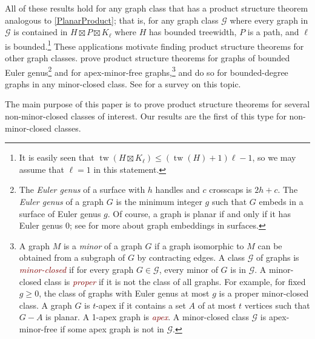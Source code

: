 \documentclass{patmorin}
\theoremstyle{plain}
\theoremstyle{definition}
\newcommand{\defin}[1]{\textcolor{Maroon}{\emph{#1}}}
\newcommand{\note}[2]{\noindent{\color{red}[#1:~#2]}}
\DeclareMathOperator{\tw}{tw}
\renewcommand{\geq}{\geqslant}
\renewcommand{\leq}{\leqslant}
\begin{document}


All of these results hold for any graph class that has a product structure theorem analogous to \cref{PlanarProduct}; that is, for any graph class  $\mathcal{G}$ where every graph in $\mathcal{G}$ is contained in $H\boxtimes P\boxtimes K_\ell$ where $H$ has bounded treewidth, $P$ is a path, and $\ell$ is bounded.\footnote{It is easily seen that $\tw(H\boxtimes K_\ell) \leq (\tw(H)+1)\ell-1$, so we may assume that $\ell=1$ in this statement.} These applications motivate finding product structure theorems for other graph classes. \citet{DJMMUW20} prove product structure theorems for graphs of bounded Euler genus\footnote{The \textit{Euler genus} of a surface with $h$ handles and $c$ crosscaps is $2h+c$. The \textit{Euler genus} of a graph $G$ is the minimum integer $g$ such that $G$ embeds in a surface of Euler genus $g$. Of course, a graph is planar if and only if it has Euler genus 0; see \citep{mohar.thomassen:graphs} for more about graph embeddings in surfaces.} and for apex-minor-free graphs,\footnote{A graph $M$ is a \textit{minor} of a graph $G$ if a graph isomorphic to $M$ can be obtained from a subgraph of $G$ by contracting edges. A class $\mathcal{G}$ of graphs is \defin{minor-closed} if for every graph $G\in\mathcal{G}$, every minor of $G$ is in $\mathcal{G}$. A minor-closed class is \defin{proper} if it is not the class of all graphs. For example, for fixed $g\geq 0$, the class of graphs with Euler genus at most $g$ is a proper minor-closed class. A graph $G$ is $t$-apex if it contains a set $A$ of at most $t$ vertices such that $G-A$ is planar. A 1-apex graph is \defin{apex}.  A minor-closed class $\mathcal{G}$ is apex-minor-free if some apex graph is not in $\mathcal{G}$.} and \citet{DEMWW22} do so for bounded-degree graphs in any minor-closed class. See 
\citep{DHJLW21} for a survey on this topic.

The main purpose of this paper is to prove product structure theorems for several non-minor-closed classes of interest. Our results are the first of this type for non-minor-closed classes.
\end{document}
